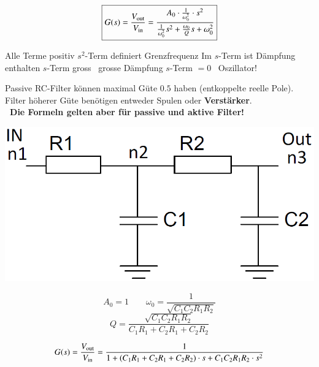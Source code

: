 \vspace{0.2cm}

\begin{minipage}[t]{0.48\columnwidth}
    \begin{center}
    \end{center}
    $$ \boxed{ G(s) = \frac{V_{\rm out}}{V_{\rm in}} = \frac{A_0 \cdot \frac{1}{\omega_0^2} \cdot s^2}{\frac{1}{\omega_0^2} s^2 + \frac{\omega_0}{Q} s + \omega_0^2 } } $$
\end{minipage}
\hfill
\begin{minipage}[t]{0.48\columnwidth}
    \begin{center}
    \end{center}
    \begin{outline}
        \1 Alle Terme positiv
        \1 $s^2$-Term definiert Grenzfrequenz
        \1 Im $s$-Term ist Dämpfung enthalten
            \2 $s$-Term gross \textrightarrow\ grosse Dämpfung
            \2 $s$-Term $= 0$ \textrightarrow\ Oszillator!
    \end{outline}
\end{minipage}

\vspace{0.2cm}

Passive RC-Filter können maximal Güte $0.5$ haben (entkoppelte reelle Pole). Filter höherer Güte benötigen entweder
Spulen oder \textbf{Verstärker}. \\
\textbf{\textrightarrow\ Die Formeln gelten aber für passive und aktive Filter!}




\begin{minipage}[c]{0.4\columnwidth}
    \includegraphics[width=\columnwidth]{images/tiefpass_ordnung_2.png}
\end{minipage}
\hfill
\begin{minipage}[c]{0.58\columnwidth}
    $$ A_0 = 1 \qquad \omega_0 = \frac{1}{\sqrt{C_1 C_2 R_1 R_2}} $$
    $$ Q = \frac{\sqrt{C_1 C_2 R_1 R_2}}{C_1 R_1 + C_2 R_1 + C_2 R_2} $$
\end{minipage}
$$ G(s) = \frac{V_{\rm out}}{V_{\rm in}} = \frac{1}{1 + (C_1 R_1 + C_2 R_1 + C_2 R_2) \cdot s + C_1 C_2 R_1 R_2 \cdot s^2 } $$